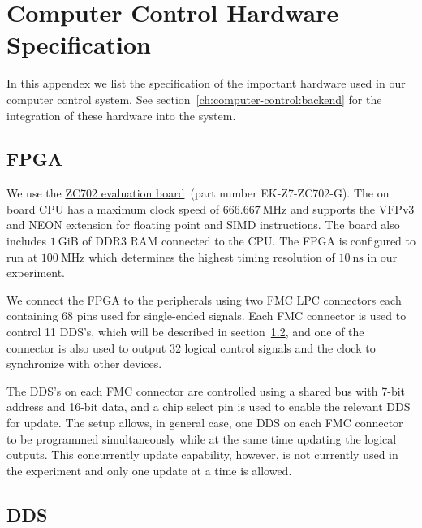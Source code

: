 
\chapter{Computer Control Hardware Specification}
\label{appendex:computer-control}

In this appendex we list the specification of the important hardware
used in our computer control system.
See section~\ref{ch:computer-control:backend} for the integration
of these hardware into the system.

\section{FPGA}
\label{appendex:computer-control:fpga}

We use the \href{https://www.xilinx.com/products/boards-and-kits/ek-z7-zc702-g.html}{ZC702 evaluation board}~(part number EK-Z7-ZC702-G).
The on board CPU has a maximum clock speed of $666.667~\mathrm{MHz}$
and supports the VFPv3 and NEON extension for floating point and SIMD instructions.
The board also includes $1~\mathrm{GiB}$ of DDR3 RAM connected to the CPU.
The FPGA is configured to run at $100~\mathrm{MHz}$ which determines
the highest timing resolution of $10~\mathrm{ns}$ in our experiment.

We connect the FPGA to the peripherals using two FMC LPC connectors
each containing 68 pins used for single-ended signals.
Each FMC connector is used to control 11 DDS's,
which will be described in section~\ref{appendex:computer-control:fpga},
and one of the connector is also used to output 32 logical control signals
and the clock to synchronize with other devices.

The DDS's on each FMC connector are controlled using a shared bus with 7-bit address
and 16-bit data, and a chip select pin is used to enable the relevant DDS for update.
The setup allows, in general case, one DDS on each FMC connector to be programmed
simultaneously while at the same time updating the logical outputs.
This concurrently update capability, however, is not currently used in the experiment
and only one update at a time is allowed.

\section{DDS}
\label{appendex:computer-control:fpga}

